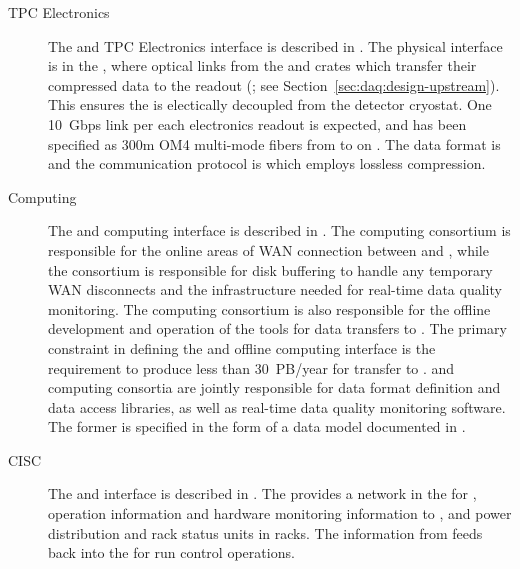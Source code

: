 \begin{description}
\item[TPC Electronics] The  and TPC Electronics interface is
  described in .
  The physical interface is in the , where optical links from the
   and  crates which transfer their compressed data to the
    readout (; see
  Section~\ref{sec:daq:design-upstream}).
  This ensures the  is electically decoupled from the detector
  cryostat.
  One \SI{10}{Gbps} link per each electronics readout is expected, and has been
  specified as 300m OM4 multi-mode fibers from 
  to  on .
  The data format is  and the communication protocol is
   which employs lossless compression.

\item[Computing] The  and computing interface is described in
  .
  The computing consortium is responsible for the online areas of WAN connection
  between \surf and \fnal, while the  consortium is responsible for
  disk buffering to handle any temporary WAN disconnects and the infrastructure
  needed for real-time data quality monitoring. 
  The computing consortium is also responsible for the offline development and
  operation of the tools for data transfers to \fnal.
  The primary constraint in defining the  and offline computing
  interface is the requirement to produce less than \SI{30}{PB/year} for
  transfer to \fnal.
   and computing consortia are jointly responsible for data format
  definition and data access libraries, as well as real-time data quality
  monitoring software.
  The former is specified in the form of a data model documented in
  .

\item[CISC] The  and  interface is described in
  . 
  The  provides a network in the  for ,
  operation information and hardware monitoring information to , and
  power distribution and rack status units in  racks. 
  The information from  feeds back into the  for run
  control operations.


\end{description}
